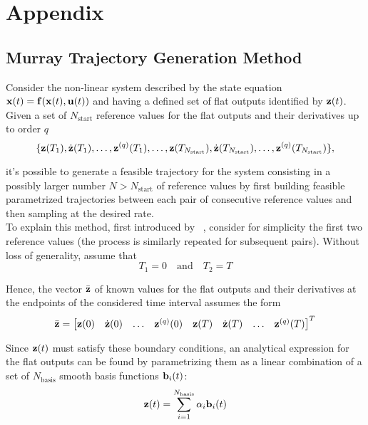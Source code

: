 \documentclass[../main.tex]{subfiles}
\begin{document}
\section{Appendix}\label{appendix}

\subsection{Murray Trajectory Generation Method}\label{app:murray}

Consider the non-linear system described by the state equation
$\mathbf{x}(t) = \mathbf{f}(\mathbf{x}(t), \mathbf{u}(t))$ and having a defined set of flat outputs
identified by $\mathbf{z}(t)$.
Given a set of $N_{\text{start}}$ reference values for the flat outputs and their derivatives up to
order $q$
\begin{equation*}
	\{ \mathbf{z}(T_1), \dot{\mathbf{z}}(T_1), \ldots, \mathbf{z}^{(q)}(T_1), \dots,
		\mathbf{z}(T_{N_{\text{start}}}), \dot{\mathbf{z}}(T_{N_{\text{start}}}),
	\ldots, \mathbf{z}^{(q)}(T_{N_{\text{start}}}) \},
\end{equation*}

it's possible to generate a feasible trajectory for the system consisting in a
possibly larger number $N > N_{\text{start}}$ of reference values by first building
feasible parametrized trajectories between each pair of consecutive reference values and then
sampling at the desired rate.\\
To explain this method, first introduced by ~\cite{murray},
consider for simplicity the first two reference values (the process is similarly
repeated for subsequent pairs). Without loss of generality, assume that
\begin{equation*}
	T_1 = 0 \quad \text{and} \quad T_2 = T
\end{equation*}

Hence, the vector $\bar{\mathbf{z}}$ of known values for the flat outputs and their derivatives at
the endpoints of the considered time interval assumes the form
\begin{equation*}
	\bar{\mathbf{z}} = \begin{bmatrix}
		\mathbf{z}(0) & \dot{\mathbf{z}}(0) & \ldots & \mathbf{z}^{(q)}(0) & \mathbf{z}(T) &
		\dot{\mathbf{z}}(T) & \ldots & \mathbf{z}^{(q)}(T)
	\end{bmatrix}^T
\end{equation*}

Since $\mathbf{z}(t)$ must satisfy these boundary conditions, an analytical
expression for the flat outputs can be found by parametrizing them as a linear
combination of a set of $N_{\text{basis}}$ smooth basis functions
$\mathbf{b}_i(t)$:
\begin{equation*}
	\mathbf{z}(t) = \sum_{i=1}^{N_{\text{basis}}} \alpha_i \mathbf{b}_i(t)
\end{equation*}
\end{document}
